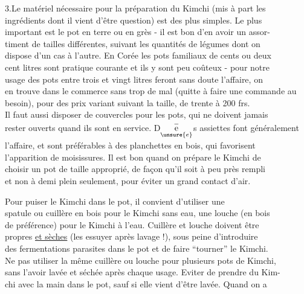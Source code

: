 {\begin{minipage}{\textwidth}
3.\quad Le matériel nécessaire pour la préparation du Kimchi (mis à part les\\
ingrédients dont il vient d'être question) est des plus simples. Le plus\\
important est le pot en terre ou en grès - il est bon d'en avoir un assor-\\
timent de tailles différentes, suivant les quantités de légumes dont on\\
dispose d'un cas à l'autre. En Corée les pots familiaux de cents ou deux\\
cent litres sont pratique courante et ils y sont peu coûteux - pour notre\\
usage des pots entre trois et vingt litres feront sans doute l'affaire, on\\
en trouve dans le commerce sans trop de mal (quitte à faire une commande au\\
besoin), pour des prix variant suivant la taille, de trente à 200 frs.\\
Il faut aussi disposer de couvercles pour les pots, qui ne doivent jamais\\
rester ouverts quand ils sont en service. D$\underset{\unsure{e}}{\overset{-}{\mathrm e}}$s assiettes font généralement\\
l'affaire, et sont préférables à des planchettes en bois, qui favorisent\\
l'apparition de moisissures. Il est bon quand on prépare le Kimchi de\\
choisir un pot de taille approprié, de façon qu'il soit à peu près rempli\\
et non à demi plein seulement, pour éviter un grand contact d'air.

Pour puiser le Kimchi dans le pot, il convient d'utiliser une\\
spatule ou cuillère en bois pour le Kimchi sans eau, une louche (en bois\\
de préférence) pour le Kimchi à l'eau. Cuillère et louche doivent être\\
propres \uline{et sèches} (les essuyer après lavage !), sous peine d'introduire\\
des fermentations parasites dans le pot et de faire ``tourner'' le Kimchi.\\
Ne pas utiliser la même cuillère ou louche pour plusieurs pots de Kimchi,\\
sans l'avoir lavée et séchée après chaque usage. Eviter de prendre du Kim-\\
chi avec la main dans le pot, sauf si elle vient d'être lavée. Quand on a
\end{minipage}}
